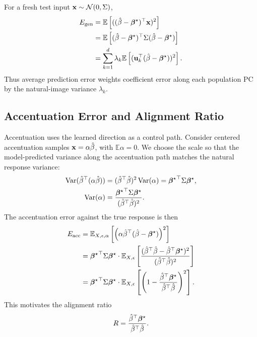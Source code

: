 For a fresh test input $\mathbf{x}\sim\mathcal{N}(0,\Sigma)$,
\begin{align}
    E_{\mathrm{gen}}
    &=
    \mathbb{E}\left[
    ((\hat{\beta}-\boldsymbol{\beta}^{\star})^\top\mathbf{x})^2
    \right] \\
    &=
    \mathbb{E}\left[
    (\hat{\beta}-\boldsymbol{\beta}^{\star})^\top\Sigma(\hat{\beta}-\boldsymbol{\beta}^{\star})
    \right] \\
    &=
    \sum_{k=1}^{d}
    \lambda_k
    \mathbb{E}\left[
    (\mathbf{u}_k^\top(\hat{\beta}-\boldsymbol{\beta}^{\star}))^2
    \right].
    \label{eq:app_gen}
\end{align}
Thus average prediction error weights coefficient error along each population PC by the natural-image variance $\lambda_k$.

\subsection{Accentuation Error and Alignment Ratio}

Accentuation uses the learned direction as a control path. Consider centered accentuation samples $\mathbf{x}=\alpha\hat{\beta}$, with $\mathbb{E}\alpha=0$. We choose the scale so that the model-predicted variance along the accentuation path matches the natural response variance:
\begin{align}
    \operatorname{Var}(\hat{\beta}^\top(\alpha\hat{\beta}))
    &=
    (\hat{\beta}^\top\hat{\beta})^2\operatorname{Var}(\alpha)
    =
    {\boldsymbol{\beta}^{\star}}^{\top}\Sigma\boldsymbol{\beta}^{\star},\\
    \operatorname{Var}(\alpha)
    &=
    \frac{{\boldsymbol{\beta}^{\star}}^{\top}\Sigma\boldsymbol{\beta}^{\star}}{(\hat{\beta}^\top\hat{\beta})^2}.
\end{align}
The accentuation error against the true response is then
\begin{align}
    E_{\mathrm{acc}}
    &=
    \mathbb{E}_{X,\epsilon,\alpha}
    \left[
    \left(\alpha\hat{\beta}^\top(\hat{\beta}-\boldsymbol{\beta}^{\star})\right)^2
    \right] \\
    &=
    {\boldsymbol{\beta}^{\star}}^{\top}\Sigma\boldsymbol{\beta}^{\star}\cdot
    \mathbb{E}_{X,\epsilon}
    \left[
    \frac{(\hat{\beta}^\top\hat{\beta}-\hat{\beta}^\top\boldsymbol{\beta}^{\star})^2}
    {(\hat{\beta}^\top\hat{\beta})^2}
    \right] \\
    &=
    {\boldsymbol{\beta}^{\star}}^{\top}\Sigma\boldsymbol{\beta}^{\star}\cdot
    \mathbb{E}_{X,\epsilon}
    \left[
    \left(1-
    \frac{\hat{\beta}^\top\boldsymbol{\beta}^{\star}}{\hat{\beta}^\top\hat{\beta}}
    \right)^2
    \right].
    \label{eq:app_acc_exact}
\end{align}
This motivates the alignment ratio
\begin{equation}
    R=\frac{\hat{\beta}^\top\boldsymbol{\beta}^{\star}}{\hat{\beta}^\top\hat{\beta}}.
\end{equation}

